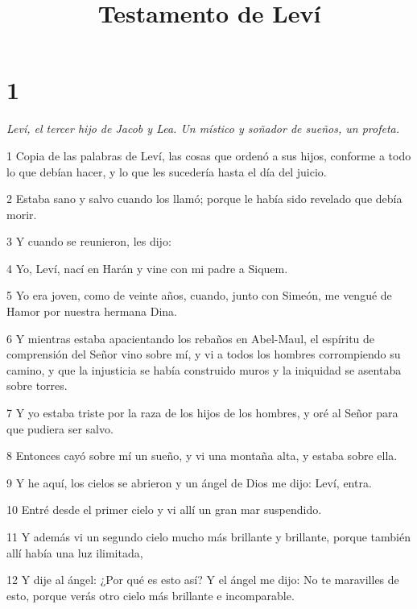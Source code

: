 

\title{Testamento de Leví}

\chapter{1}

\par \textit{Leví, el tercer hijo de Jacob y Lea. Un místico y soñador de sueños, un profeta.}

\par 1 Copia de las palabras de Leví, las cosas que ordenó a sus hijos, conforme a todo lo que debían hacer, y lo que les sucedería hasta el día del juicio.

\par 2 Estaba sano y salvo cuando los llamó; porque le había sido revelado que debía morir.

\par 3 Y cuando se reunieron, les dijo:

\par 4 Yo, Leví, nací en Harán y vine con mi padre a Siquem.

\par 5 Yo era joven, como de veinte años, cuando, junto con Simeón, me vengué de Hamor por nuestra hermana Dina.

\par 6 Y mientras estaba apacientando los rebaños en Abel-Maul, el espíritu de comprensión del Señor vino sobre mí, y vi a todos los hombres corrompiendo su camino, y que la injusticia se había construido muros y la iniquidad se asentaba sobre torres.

\par 7 Y yo estaba triste por la raza de los hijos de los hombres, y oré al Señor para que pudiera ser salvo.

\par 8 Entonces cayó sobre mí un sueño, y vi una montaña alta, y estaba sobre ella.

\par 9 Y he aquí, los cielos se abrieron y un ángel de Dios me dijo: Leví, entra.

\par 10 Entré desde el primer cielo y vi allí un gran mar suspendido.

\par 11 Y además vi un segundo cielo mucho más brillante y brillante, porque también allí había una luz ilimitada,

\par 12 Y dije al ángel: ¿Por qué es esto así? Y el ángel me dijo: No te maravilles de esto, porque verás otro cielo más brillante e incomparable.

